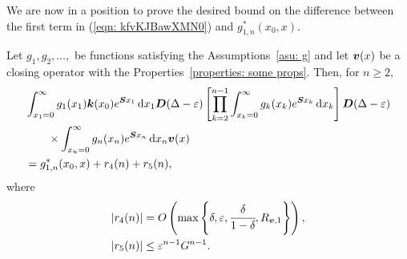 We are now in a position to prove the desired bound on the difference between the first term in (\ref{eqn: kfvKJBawXMN0}) and \(g^*_{1,n}(x_0,x)\).
\begin{lem}\label{lem: lst convergence}
	Let \(g_1,g_2,\dots,\) be functions satisfying the Assumptions~\ref{asu: g} and let \(\boldsymbol v(x)\) be a closing operator with the Properties~\ref{properties: some props}. Then, for \(n\geq 2\),  
	\begin{align}
		&\int_{x_1=0}^\infty g_1(x_1) \boldsymbol k(x_0) e^{\boldsymbol{S}x_1}\, \mathrm{d} x_1 \boldsymbol D(\Delta-\varepsilon)
            	\left[\prod_{k=2}^{n-1}\int_{x_k=0}^\infty g_k(x_k) e^{\boldsymbol{S}x_k} \, \mathrm{d} x_k \right]
		\boldsymbol D(\Delta-\varepsilon) \nonumber 
		\\&\qquad\times\int_{x_n=0}^\infty g_{n}(x_n) e^{\boldsymbol{S}x_n} \, \mathrm{d} x_n {\boldsymbol v}(x) \nonumber 
		\\& =g^{*}_{1,n}(x_0,x) + r_4(n) + r_5(n), \label{eqn: rhs g 2}
	\end{align}
	where  
	\begin{align*}
		|r_4(n)|&= O\left(\max\left\{\delta,\varepsilon,\cfrac{\delta}{1-\delta},R_{{\boldsymbol v},1}\right\}\right),
		\\|r_5(n)| &\leq \varepsilon^{n-1}G^{n-1}.
	\end{align*}
\end{lem}

